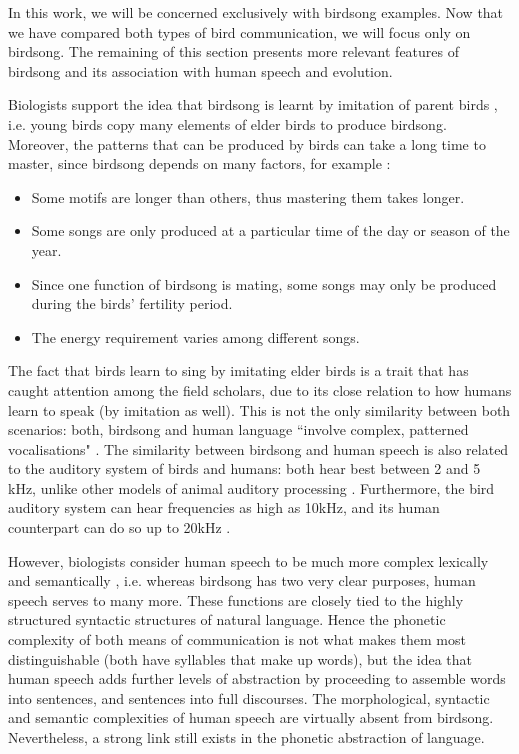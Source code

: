 \documentclass[../main.tex]{subfiles} \label{chapter_soa}
\begin{document}
\par In this work, we will be concerned exclusively with birdsong examples. Now that we have compared both types of bird communication, we will focus only on birdsong. The remaining of this section presents more relevant features of birdsong and its association with human speech and evolution.
\par Biologists support the idea that birdsong is learnt by imitation of parent birds \cite{Berwick2013}, i.e. young birds copy many elements of elder birds to produce birdsong. Moreover, the patterns that can be produced by birds can take a long time to master, since birdsong depends on many factors, for example \cite{Naguib2014}: 
\begin{itemize}
\item Some motifs are longer than others, thus mastering them takes longer.
\item Some songs are only produced at a particular time of the day or season of the year.
\item Since one function of birdsong is mating, some songs may only be produced during the birds' fertility period.
\item The energy requirement varies among different songs.
\end{itemize}
\par The fact that birds learn to sing by imitating elder birds is a trait that has caught attention among the field scholars, due to its close relation to how humans learn to speak (by imitation as well). This is not the only similarity between both scenarios: both, birdsong and human language ``involve complex, patterned vocalisations" \cite{Berwick2013,Naguib2014}. The similarity between birdsong and human speech is also related to the auditory system of birds and humans: both hear best between 2 and 5 kHz, unlike other models of animal auditory processing \cite{Snowdon2013}. Furthermore, the bird auditory system can hear frequencies as high as 10kHz, and its human counterpart can do so up to 20kHz \cite{Snowdon2013}.
\par However, biologists consider human speech to be much more complex lexically and semantically \cite{Berwick2013}, i.e. whereas birdsong has two very clear purposes, human speech serves to many more. These functions are closely tied to the highly structured syntactic structures of natural language. Hence the phonetic complexity of both means of communication is not what makes them most distinguishable (both have syllables that make up words), but the idea that human speech adds further levels of abstraction by proceeding to assemble words into sentences, and sentences into full discourses. The morphological, syntactic and semantic complexities of human speech are virtually absent from birdsong. Nevertheless, a strong link still exists in the phonetic abstraction of language.
\end{document}
